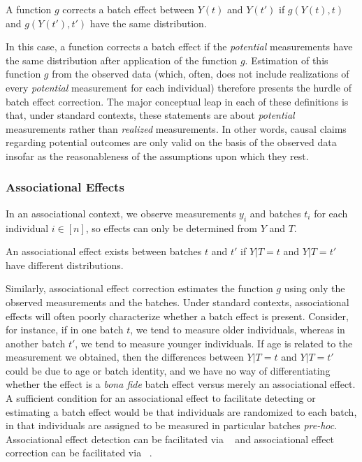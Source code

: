 {{\begin{definition}
A function $g$ corrects a batch effect between $Y(t)$ and $Y(t')$ if $g(Y(t), t)$ and $g(Y(t'), t')$ have the same distribution.
\label{def:batch_correct_informal}
\end{definition}

In this case, a function corrects a batch effect if the \textit{potential} measurements have the same distribution after application of the function $g$. Estimation of this function $g$ from the observed data (which, often, does not include realizations of every \textit{potential} measurement for each individual) therefore presents the hurdle of batch effect correction. The major conceptual leap in each of these definitions is that, under standard contexts, these statements are about \textit{potential} measurements rather than \textit{realized} measurements. In other words, causal claims regarding potential outcomes are only valid on the basis of the observed data insofar as the reasonableness of the assumptions upon which they rest.

\subsubsection{Associational Effects}

In an associational context, we observe measurements $y_i$ and batches $t_i$ for each individual $i \in [n]$, so effects can only be determined from $Y$ and $T$. 

\begin{flushleft}\begin{definition}
An associational effect exists between batches $t$ and $t'$ if $Y | T = t$ and $Y | T = t'$ have different distributions.
\label{def:ass_site_effect_informal}
\end{definition}
\end{flushleft}

Similarly, associational effect correction estimates the function $g$ using only the observed measurements and the batches. Under standard contexts, associational effects will often poorly characterize whether a batch effect is present. Consider, for instance, if in one batch $t$, we tend to measure older individuals, whereas in another batch $t'$, we tend to measure younger individuals. If age is related to the measurement we obtained, then the differences between $Y | T = t$ and $Y | T = t'$ could be due to age or batch identity, and we have no way of differentiating whether the effect is a \textit{bona fide} batch effect versus merely an associational effect. A sufficient condition for an associational effect to facilitate detecting or estimating a batch effect would be that individuals are randomized to each batch, in that individuals are assigned to be measured in particular batches \textit{pre-hoc}. Associational effect detection can be facilitated via \Dcorr~\cite{Szekely2007Dec} and associational effect correction can be facilitated via \Combat~\cite{Johnson2007Jan}.

}}
